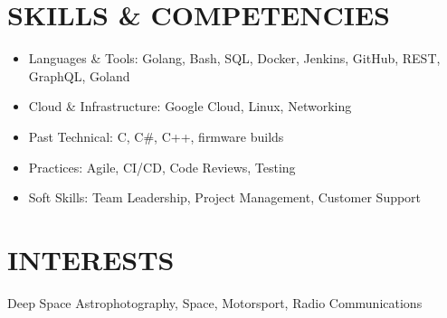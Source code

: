 \documentclass[11pt,a4paper,roman]{moderncv}
\begin{document}
\section{SKILLS \& COMPETENCIES}
\begin{minipage}{\maincolumnwidth}%
\small{
\begin{itemize}
  \item Languages \& Tools: Golang, Bash, SQL, Docker, Jenkins, GitHub, REST, GraphQL, Goland
  \item Cloud \& Infrastructure: Google Cloud, Linux, Networking
   \item Past Technical: C, C\#, C++, firmware builds
  \item Practices: Agile, CI/CD, Code Reviews, Testing
  \item Soft Skills: Team Leadership, Project Management, Customer Support 
\end{itemize}}%
\end{minipage}%

\section{INTERESTS}
\begin{minipage}{\maincolumnwidth}%
\small{Deep Space Astrophotography, Space, Motorsport, Radio Communications}%
\end{minipage}%
\end{document}

